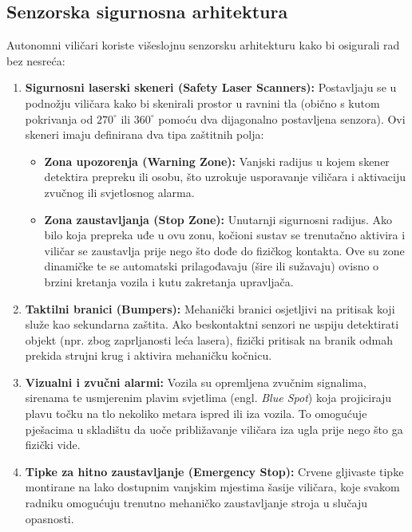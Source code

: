 \documentclass[12pt,a4paper]{article}
\begin{document}
\subsection{Senzorska sigurnosna arhitektura}
Autonomni viličari koriste višeslojnu senzorsku arhitekturu kako bi osigurali rad bez nesreća:
\begin{enumerate}
    \item \textbf{Sigurnosni laserski skeneri (Safety Laser Scanners):} Postavljaju se u podnožju viličara kako bi skenirali prostor u ravnini tla (obično s kutom pokrivanja od $270^\circ$ ili $360^\circ$ pomoću dva dijagonalno postavljena senzora). Ovi skeneri imaju definirana dva tipa zaštitnih polja:
    \begin{itemize}
        \item \textbf{Zona upozorenja (Warning Zone):} Vanjski radijus u kojem skener detektira prepreku ili osobu, što uzrokuje usporavanje viličara i aktivaciju zvučnog ili svjetlosnog alarma.
        \item \textbf{Zona zaustavljanja (Stop Zone):} Unutarnji sigurnosni radijus. Ako bilo koja prepreka uđe u ovu zonu, kočioni sustav se trenutačno aktivira i viličar se zaustavlja prije nego što dođe do fizičkog kontakta. Ove su zone dinamičke te se automatski prilagođavaju (šire ili sužavaju) ovisno o brzini kretanja vozila i kutu zakretanja upravljača.
    \end{itemize}
    \item \textbf{Taktilni branici (Bumpers):} Mehanički branici osjetljivi na pritisak koji služe kao sekundarna zaštita. Ako beskontaktni senzori ne uspiju detektirati objekt (npr. zbog zaprljanosti leća lasera), fizički pritisak na branik odmah prekida strujni krug i aktivira mehaničku kočnicu.
    \item \textbf{Vizualni i zvučni alarmi:} Vozila su opremljena zvučnim signalima, sirenama te usmjerenim plavim svjetlima (engl. \textit{Blue Spot}) koja projiciraju plavu točku na tlo nekoliko metara ispred ili iza vozila. To omogućuje pješacima u skladištu da uoče približavanje viličara iza ugla prije nego što ga fizički vide.
    \item \textbf{Tipke za hitno zaustavljanje (Emergency Stop):} Crvene gljivaste tipke montirane na lako dostupnim vanjskim mjestima šasije viličara, koje svakom radniku omogućuju trenutno mehaničko zaustavljanje stroja u slučaju opasnosti.
\end{enumerate}
\end{document}
